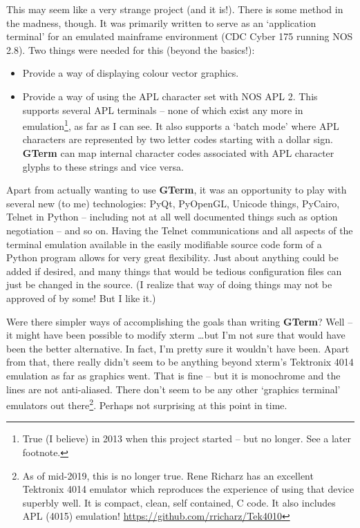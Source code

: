 \documentclass[a4paper,twoside,11pt]{article}
\newcommand{\newpara}{\par\vspace{4mm}\noindent}
\newcommand{\textbfc}[1]{\textcolor{OurRed}{#1}}
\begin{document}
This may seem like a very strange project (and it is!). There is some method in the madness, though.
\textbfc{It was primarily written to serve
as an `application terminal' for an emulated mainframe environment (CDC Cyber 175 running NOS 2.8)}.
Two things were needed for this (beyond the basics!):
\begin{itemize}
\item \textbfc{Provide a way of displaying colour vector graphics}.
\item \textbfc{Provide a way of using the APL character set with NOS APL 2.} This supports several APL terminals --
      none of which exist any more in emulation\footnote{True (I believe) in 2013 when 
      this project started -- but no longer. See a later footnote.}, 
      as far as I can see. It also supports a `batch mode'
      where APL characters are represented by two letter codes starting with a dollar sign. \textbf{GTerm} can
      map internal character codes associated with APL character glyphs to these strings and vice versa.
\end{itemize}
Apart from actually wanting to use \textbf{GTerm}, it was an opportunity to play with several new (to me) technologies: PyQt, PyOpenGL,
Unicode things, PyCairo, Telnet in Python -- including not at all well documented things such as option negotiation -- and
so on. Having the Telnet communications and all aspects of the terminal emulation available in the easily
modifiable source code form of a Python program allows for very great flexibility. Just about anything could
be added if desired, and many things that would be tedious configuration files can just be changed in the source.
(I realize that way of doing things may not be approved of by some! But I like it.)
\newpara
Were there simpler ways of accomplishing the goals than writing \textbf{GTerm}? Well -- it might have been possible to
modify xterm \ldots but I'm not sure that would have been the better alternative. In fact, I'm pretty sure it wouldn't
have been. Apart from that, there really didn't seem to be anything beyond xterm's Tektronix 4014 emulation as far
as graphics went. That is fine -- but it is monochrome and the lines are not anti-aliased. There don't seem to be
any other `graphics terminal' emulators out there\footnote{As of mid-2019, this is no longer true.
Rene Richarz has an excellent Tektronix 4014 emulator which reproduces the experience of using that
device superbly well. It is compact, clean, self contained, C code. It also includes APL (4015) emulation!
\url{https://github.com/rricharz/Tek4010}}. Perhaps not surprising at this point in time.
\end{document}
